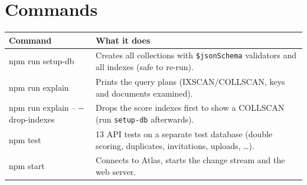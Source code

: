 \documentclass[11pt,a4paper]{article}
\newcommand{\op}[1]{\texttt{\$#1}}
\begin{document}
\appendix
\section{Commands}
\begin{tabularx}{\linewidth}{@{}>{\ttfamily}p{5.2cm}X@{}}
\toprule
\normalfont\textbf{Command} & \textbf{What it does}\\
\midrule
npm run setup-db & Creates all collections with \op{jsonSchema} validators and all indexes (safe to re-run). \\
npm run explain & Prints the query plans (IXSCAN/COLLSCAN, keys and documents examined). \\
npm run explain -- -{}-drop-indexes & Drops the score indexes first to show a COLLSCAN (run \texttt{setup-db} afterwards). \\
npm test & 13 API tests on a separate test database (double scoring, duplicates, invitations, uploads, \dots). \\
npm start & Connects to Atlas, starts the change stream and the web server. \\
\bottomrule
\end{tabularx}
\end{document}
